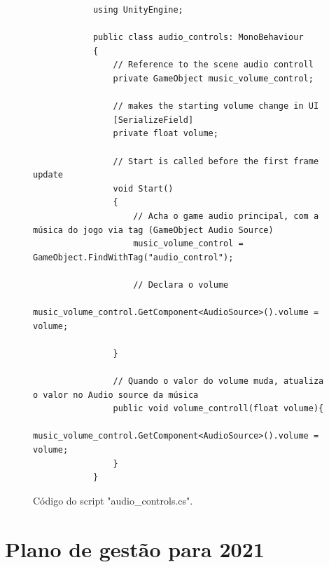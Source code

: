     \begin{figure}[ht!]
        \centering
        \begin{lstlisting}
            using UnityEngine;

            public class audio_controls: MonoBehaviour
            {
                // Reference to the scene audio controll 
                private GameObject music_volume_control;

                // makes the starting volume change in UI
                [SerializeField]
                private float volume;

                // Start is called before the first frame update
                void Start()
                {
                    // Acha o game audio principal, com a música do jogo via tag (GameObject Audio Source)
                    music_volume_control = GameObject.FindWithTag("audio_control");
                    
                    // Declara o volume 
                    music_volume_control.GetComponent<AudioSource>().volume = volume;

                }

                // Quando o valor do volume muda, atualiza o valor no Audio source da música
                public void volume_controll(float volume){
                    music_volume_control.GetComponent<AudioSource>().volume = volume;
                }
            }

        \end{lstlisting}
        \label{volume_code}
        \caption{Código do script "audio\_controls.cs".}

    \end{figure}



\chapter{Plano de gestão para 2021}

\newpage

